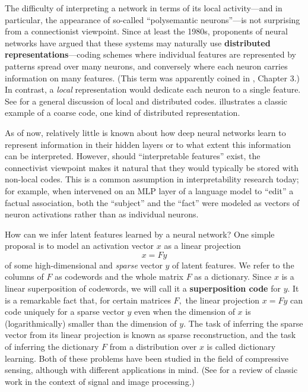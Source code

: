 The difficulty of interpreting a network in terms of its local activity---and in particular, the appearance of so-called ``polysemantic neurons''---is not surprising from a connectionist viewpoint. Since at least the 1980s, proponents of neural networks have argued that these systems may naturally use \textbf{distributed representations}---coding schemes where individual features are represented by patterns spread over many neurons, and conversely where each neuron carries information on many features. (This term was apparently coined in \cite{rumelhart_parallel_1986}, Chapter 3.) In contrast, a \textit{local} representation would dedicate each neuron to a single feature. See \cite{thorpe_local_1989} for a general discussion of local and distributed codes.  illustrates a classic example of a coarse code, one kind of distributed representation.

As of now, relatively little is known about how deep neural networks learn to represent information in their hidden layers or to what extent this information can be interpreted. However, should ``interpretable features'' exist, the connectivist viewpoint makes it natural that they would typically be stored with non-local codes. This is a common assumption in interpretability research today; for example, when \citet{meng_locating_2022} intervened on an MLP layer of a language model to ``edit'' a factual association, both the ``subject'' and the ``fact'' were modeled as vectors of neuron activations rather than as individual neurons.

How can we infer latent features learned by a neural network? One simple proposal is to model an activation vector $x$ as a linear projection
\begin{equation*}
	x = F y \label{eq:linear-model}
\end{equation*}
of some high-dimensional and \textit{sparse} vector $y$ of latent features. We refer to the columns of $F$ as codewords and the whole matrix $F$ as a dictionary. Since $x$ is a linear superposition of codewords, we will call it a \textbf{superposition code} for $y.$ It is a remarkable fact that, for certain matrices $F,$ the linear projection $x = F y$ can code uniquely for a sparse vector $y$ even when the dimension of $x$ is (logarithmically) smaller than the dimension of $y.$ The task of inferring the sparse vector from its linear projection is known as sparse reconstruction, and the task of inferring the dictionary $F$ from a distribution over $x$ is called dictionary learning. Both of these problems have been studied in the field of compressive sensing, although with different applications in mind. (See \cite{elad_sparse_2010} for a review of classic work in the context of signal and image processing.)

